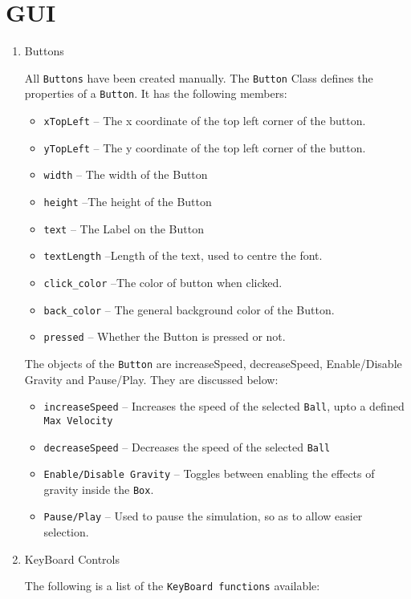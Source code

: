 \documentclass[]{article}
\newcommand{\ty}[1]{\texttt{#1}}
\begin{document}
\section{GUI}
\begin{enumerate}
\item Buttons 
	\begin{flushleft}	
		All \texttt{Buttons} have been created manually. The \texttt{Button} Class defines the properties of a \texttt{Button}. It has the following members:
		\begin{itemize}
			\item \ty{xTopLeft} -- The x coordinate of the top left corner of the button.
			\item \ty{yTopLeft} -- The y coordinate of the top left corner of the button.
\item \ty{width} -- The width of the Button
\item \ty{height} --The height of the Button
\item \ty{text} -- The Label on the Button
\item \ty{textLength} --Length of the text, used to centre the font.
\item \ty{click\_color} --The color of button when clicked.
\item \ty{back\_color} -- The general background color of the Button.
\item \ty{pressed} -- Whether the Button is pressed or not. 
\end{itemize}
The objects of the \texttt{Button} are increaseSpeed, decreaseSpeed, Enable/Disable Gravity and Pause/Play. They are discussed below:
\begin{itemize}
\item \ty{increaseSpeed} -- Increases the speed of the selected \texttt{Ball}, upto a defined \texttt{Max Velocity}
\item \ty{decreaseSpeed} -- Decreases the speed of the selected \texttt{Ball}
\item \ty{Enable/Disable Gravity} -- Toggles between enabling the effects of gravity inside the \texttt{Box}. 
\item \ty{Pause/Play} -- Used to pause the simulation, so as to allow easier selection.
\end{itemize}
\end{flushleft}
\item {KeyBoard Controls}
\begin{flushleft}
The following is a list of the \ty{KeyBoard functions} available: 
\begin{itemize}

\end{itemize}
\end{flushleft}
\end{enumerate}
\end{document}
